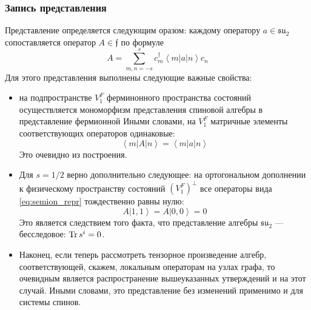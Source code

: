 \subsubsection{Запись представления}
Представление определяется следующим оразом: каждому оператору $a \in \mathfrak{su}_2$ сопоставляется оператор $A \in \mathfrak{f}$ по формуле
\begin{equation}
\label{eq:semion_repr}
A = \sum_{m, n = - s}^s c^\dagger_m \left\langle m \left| a \right| n \right\rangle c_n
\end{equation}
Для этого представления выполнены следующие важные свойства:
\begin{itemize}
	\item на подпространстве $V^F_1$ ферминонного пространства состояний осуществляется мономорфизм представления спиновой алгебры в представление фермионной Иными словами, на $V^F_1$ матричные элементы соответствующих операторов одинаковые:
	$$ \left\langle {m} \left| A \right| {n} \right\rangle =  \left\langle m \left| a \right| n \right\rangle $$
	Это очевидно из построения.
	
	\item Для $s = 1/2$ верно дополнительно следующее: на ортогональном дополнении к физическому пространству состояний $\left( V^F_1 \right)^\perp$ все операторы вида \eqref{eq:semion_repr} тождественно равны нулю:
	$$ A \left| 1, 1\right\rangle = A \left| 0, 0 \right\rangle = 0$$
	Это является следствием того факта, что представление алгебры $\mathfrak{su}_2$ --- бесследовое: $ \operatorname{Tr} s^i = 0 $.
	
	\item Наконец, если теперь рассмотреть тензорное произведение алгебр, соответствующей, скажем, локальным операторам на узлах графа, то очевидным является распространение вышеуказанных утверждений и на этот случай. Иными словами, это представление без изменений применимо и для системы спинов.
\end{itemize}

